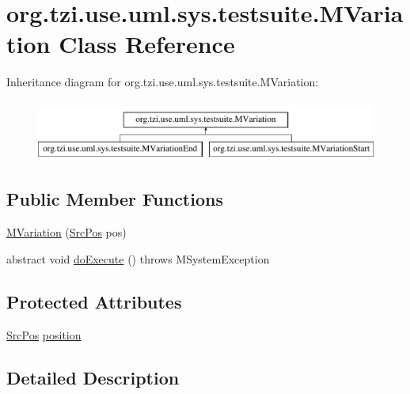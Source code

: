\hypertarget{classorg_1_1tzi_1_1use_1_1uml_1_1sys_1_1testsuite_1_1_m_variation}{\section{org.\-tzi.\-use.\-uml.\-sys.\-testsuite.\-M\-Variation Class Reference}
\label{classorg_1_1tzi_1_1use_1_1uml_1_1sys_1_1testsuite_1_1_m_variation}
}
Inheritance diagram for org.\-tzi.\-use.\-uml.\-sys.\-testsuite.\-M\-Variation\-:\begin{figure}[H]
\begin{center}
\leavevmode
\includegraphics[height=2.000000cm]{classorg_1_1tzi_1_1use_1_1uml_1_1sys_1_1testsuite_1_1_m_variation}
\end{center}
\end{figure}
\subsection*{Public Member Functions}
\begin{DoxyCompactItemize}
\item 
\hyperlink{classorg_1_1tzi_1_1use_1_1uml_1_1sys_1_1testsuite_1_1_m_variation_af91a821036f4e10f6acc31269fcf3d5b}{M\-Variation} (\hyperlink{classorg_1_1tzi_1_1use_1_1parser_1_1_src_pos}{Src\-Pos} pos)
\item 
abstract void \hyperlink{classorg_1_1tzi_1_1use_1_1uml_1_1sys_1_1testsuite_1_1_m_variation_a0dc9621da7e3ba0ff6079fd28a6a37a2}{do\-Execute} ()  throws M\-System\-Exception
\end{DoxyCompactItemize}
\subsection*{Protected Attributes}
\begin{DoxyCompactItemize}
\item 
\hyperlink{classorg_1_1tzi_1_1use_1_1parser_1_1_src_pos}{Src\-Pos} \hyperlink{classorg_1_1tzi_1_1use_1_1uml_1_1sys_1_1testsuite_1_1_m_variation_ac0dcd46ba8930c9c0096defe6db93ff3}{position}
\end{DoxyCompactItemize}


\subsection{Detailed Description}


